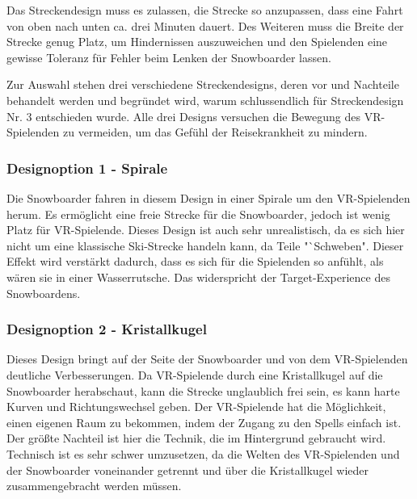 Das Streckendesign muss es zulassen, die Strecke so anzupassen, dass eine Fahrt von oben nach unten ca. drei Minuten dauert. Des Weiteren muss die Breite der Strecke genug Platz, um Hindernissen auszuweichen und den Spielenden eine gewisse Toleranz für Fehler beim Lenken der Snowboarder lassen.

Zur Auswahl stehen drei verschiedene Streckendesigns, deren vor und Nachteile behandelt werden und begründet wird, warum schlussendlich für Streckendesign Nr. 3 entschieden wurde. Alle drei Designs versuchen die Bewegung des VR-Spielenden zu vermeiden, um das Gefühl der Reisekrankheit zu mindern.

\subsubsection{Designoption 1 - Spirale}
Die Snowboarder fahren in diesem Design in einer Spirale um den VR-Spielenden herum. Es ermöglicht eine freie Strecke für die Snowboarder, jedoch ist wenig Platz für VR-Spielende. Dieses Design ist auch sehr unrealistisch, da es sich hier nicht um eine klassische Ski-Strecke handeln kann, da Teile "`Schweben". Dieser Effekt wird verstärkt dadurch, dass es sich für die Spielenden so anfühlt, als wären sie in einer Wasserrutsche. Das widerspricht der Target-Experience des Snowboardens.

\subsubsection{Designoption 2 - Kristallkugel}
Dieses Design bringt auf der Seite der Snowboarder und von dem VR-Spielenden deutliche Verbesserungen. Da VR-Spielende durch eine Kristallkugel auf die Snowboarder herabschaut, kann die Strecke unglaublich frei sein, es kann harte Kurven und Richtungswechsel geben. Der VR-Spielende hat die Möglichkeit, einen eigenen Raum zu bekommen, indem der Zugang zu den Spells einfach ist. Der größte Nachteil ist hier die Technik, die im Hintergrund gebraucht wird. Technisch ist es sehr schwer umzusetzen, da die Welten des VR-Spielenden und der Snowboarder voneinander getrennt und über die Kristallkugel wieder zusammengebracht werden müssen.

